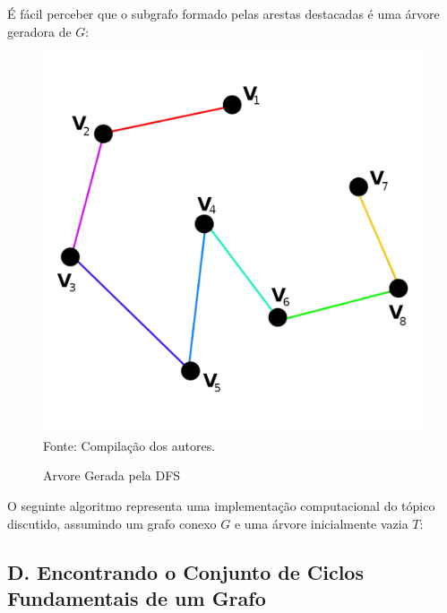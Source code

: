 \documentclass[twocolumn, 10pt]{extarticle}
\begin{document}
É fácil perceber que o subgrafo formado pelas arestas destacadas é uma árvore geradora de $G$:

\begin{figure}[H]
	\caption{Arvore Gerada pela DFS} 
	\centering
	\includegraphics[scale=0.7]{spanning2}
	\\ Fonte: Compilação dos autores.
\end{figure}

O seguinte algoritmo representa uma implementação computacional do tópico discutido, assumindo um grafo conexo $G$ e uma árvore inicialmente vazia $T$:

\begingroup
{}\label{st}
\begin{algorithmic}[1]
	\EndFor
\EndFunction
\end{algorithmic}
\hrulefill
\endgroup

\subsection*{D. \quad Encontrando o Conjunto de Ciclos Fundamentais de um Grafo}
\end{document}
